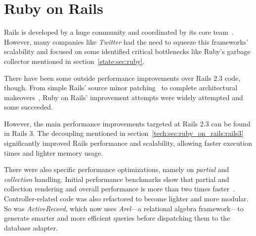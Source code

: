 \section{Ruby on Rails} %
\label{state:sec:ruby_on_rails}
Rails is developed by a huge community and coordinated by its core team~\cite{rails_core_team}. However, many companies like \textit{Twitter} had the need to squeeze this frameworks' scalability and focused on some identified critical bottlenecks like Ruby's garbage collector mentioned in section~\ref{state:sec:ruby}.

There have been some outside performance improvements over Rails 2.3 code, though. From simple Rails' source minor patching~\cite{accunote_rails} to complete architectural makeovers~\cite{distributed_rails}, Ruby on Rails' improvement attempts were widely attempted and some succeeded.

However, the main performance improvements targeted at Rails 2.3 can be found in Rails 3. The decoupling mentioned in section~\ref{tech:sec:ruby_on_rails:rails3} significantly improved Rails performance and scalability, allowing faster execution times and lighter memory usage.

There were also specific performance optimizations, namely on \textit{partial} and \textit{collection} handling. Initial performance benchmarks show that partial and collection rendering and overall performance is more than two times faster~\cite{vaporware_to_awesome,rails_merb_merge_performance}. Controller-related code was also refactored to become lighter and more modular. So was \textit{ActiveRecord}, which now uses \textit{Arel}---a relational algebra framework---to generate smarter and more efficient queries before dispatching them to the database adapter.

